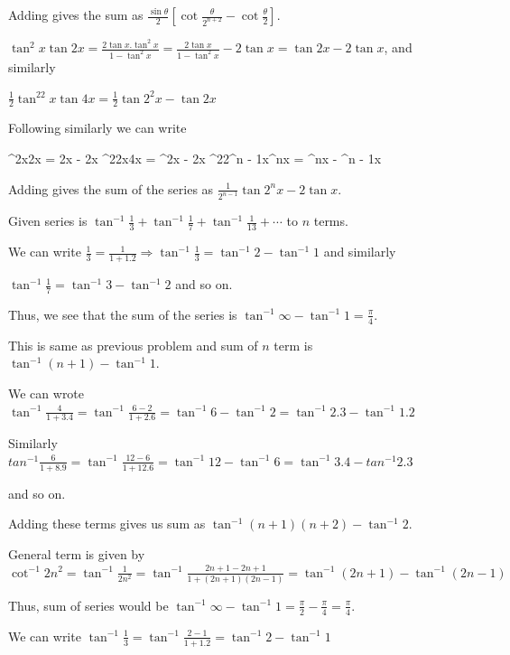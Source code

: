   Adding gives the sum as $\frac{\sin\theta}{2}\left[\cot\frac{\theta}{2^{n + 2}} -
    \cot\frac{\theta}{2}\right]$.
\item $\tan^2x\tan2x = \frac{2\tan x.\tan^2x}{1 - \tan^2x} = \frac{2\tan x}{1 - \tan^2x} - 2\tan x = \tan2x
  - 2\tan x$, and similarly

  $\frac{1}{2}\tan^22x\tan4x = \frac{1}{2}\tan2^2x - \tan 2x$

  Following similarly we can write

  \startformula\startalign
    \NC \tan^2x\tan2x \NC = \tan2x - 2\tan x\NR
    \NC {}\tan^22x\tan4x \NC = ^2x - \tan2x\NR
    \NC\NC\cdots\NR
    \NC {}\tan^22^{n - 1}x^nx \NC = ^nx - ^{n - 1}x\NR
  \stopalign\stopformula

  Adding gives the sum of the series as $\frac{1}{2^{n - 1}}\tan2^nx - 2\tan x$.
\item Given series is $\tan^{-1}\frac{1}{3} + \tan^{-1}\frac{1}{7} + \tan^{-1}\frac{1}{13} +
  \cdots$ to $n$ terms.

  We can write $\frac{1}{3} = \frac{1}{1 + 1.2}\Rightarrow \tan^{-1}\frac{1}{3} = \tan^{-1}2 - \tan^{-1}1$
  and similarly

  $\tan^{-1}\frac{1}{7} = \tan^{-1}3 - \tan^{-1}2$ and so on.

  Thus, we see that the sum of the series is $\tan^{-1}\infty - \tan^{-1}1 = \frac{\pi}{4}$.
\item This is same as previous problem and sum of $n$ term is $\tan^{-1}(n + 1) - \tan^{-1}1$.
\item We can wrote $\tan^{-1}\frac{4}{1 + 3.4} = \tan^{-1}\frac{6 - 2}{1 + 2.6} = \tan^{-1}6 - \tan^{-1}2 =
  \tan^{-1}2.3 - \tan^{-1}1.2$

  Similarly $tan^{-1}\frac{6}{1 + 8.9} = \tan^{-1}\frac{12 - 6}{1 + 12.6} = \tan^{-1}12 - \tan^{-1}6 =
  \tan^{-1}3.4 - tan^{-1}2.3$

  and so on.

  Adding these terms gives us sum as $\tan^{-1}(n + 1)(n + 2) - \tan^{-1}2$.
\item General term is given by $\cot^{-1}2n^2 = \tan^{-1}\frac{1}{2n^2} = \tan^{-1}\frac{2n + 1 - 2n + 1}{1
  + (2n + 1)(2n - 1)} = \tan^{-1}(2n + 1) - \tan^{-1}(2n - 1)$

  Thus, sum of series would be $\tan^{-1}\infty - \tan^{-1}1 = \frac{\pi}{2} - \frac{\pi}{4} =
  \frac{\pi}{4}$.
\item We can write $\tan^{-1}\frac{1}{3} = \tan^{-1}\frac{2 - 1}{1 + 1.2} = \tan^{-1}2 - \tan^{-1}1$

